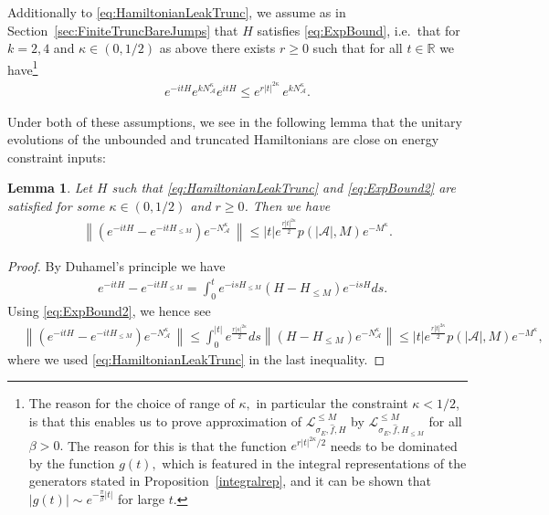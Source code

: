 \documentclass[11pt]{amsart}
\newcommand{\1}{\mathbbm{1}}
\newcommand{\R}{\mathbb{R}}
\newcommand{\N}{\mathbb{N}}
\newcommand{\NA}{N_{\mathcal{A}}}
\newcommand{\cA}{\mathcal{A}}
\newcommand{\bin}[1]{}
\theoremstyle{plain}
\newtheorem{lemma}[theorem]{Lemma}
\theoremstyle{definition}
\theoremstyle{remark}
\numberwithin{equation}{section}
\begin{document}
Additionally to \eqref{eq:HamiltonianLeakTrunc}, we assume as in Section~\ref{sec:FiniteTruncBareJumps} that $H$ satisfies \eqref{eq:ExpBound}, i.e.~that for $k=2,4$ and $\kappa\in(0,1/2)$ as above there exists $r\ge 0$ such that for all $t\in\R$ we have\footnote{The reason for the choice of range of $\kappa,$ in particular the constraint $\kappa<1/2$, is that this enables us to prove approximation of $\mathcal{L}^{\le M}_{\sigma_E,\widehat{f},H}$ by $\mathcal{L}^{\le M}_{\sigma_E,\widehat{f},H_{\le M}}$ for all $\beta>0.$ The reason for this is that the function $e^{r|t|^{2\kappa}/2}$ needs to be dominated by the function $g(t),$ which is featured in the integral representations of the generators stated in Proposition~\ref{integralrep}, and it can be shown that $|g(t)|
\sim
e^{-\tfrac{\pi}{\beta}|t|}$ for large $t.$ }
\begin{align}\label{eq:ExpBound2}
e^{-itH}e^{k\NA^\kappa} e^{itH}\le e^{r|t|^{2\kappa}}\,e^{k\NA^\kappa}.
\end{align}



\bin{\begin{align*}
    \left\|Q_Me^{-\NA^{\kappa}}\right\| \le \sup_{\substack{n_1,\cdots,n_m\in\N_0\\\exists n_i\ge M}} e^{-\sqrt{\sum_i n_i}} \le e^{-M^{\kappa}}.
\end{align*}}

Under both of these assumptions, we see in the following lemma that the unitary evolutions of the unbounded and truncated Hamiltonians are close on energy constraint inputs:
\begin{lemma}
\label{lem:HamEvolTrunc}
Let $H$ such that \eqref{eq:HamiltonianLeakTrunc} and \eqref{eq:ExpBound2} are satisfied for some $\kappa\in(0,1/2)$ and $r\ge 0$. Then we have
\begin{align*}
    \left\|\left(e^{-itH} - e^{-itH_{\le M}}\right)e^{-\NA^{\kappa}}\,\right\| \le |t|e^{\tfrac{r|t|^{2\kappa}}{2}}p(|\cA|,M)e^{-M^{\kappa}}.
\end{align*}

\end{lemma}
\begin{proof}
By Duhamel's principle we have
\begin{align*}
   &e^{-itH} - e^{-itH_{\le M}}= \int^t_0 e^{-isH_{\le M}}\left(H-H_{\le M}\right)e^{-isH} ds.
\end{align*}
Using \eqref{eq:ExpBound2}, we hence see
\begin{align*}
     &\left\|\left(e^{-itH} - e^{-itH_{\le M}}\right)e^{-\NA^{\kappa}}\,\right\| \le  \int_0^{|t|} e^{\tfrac{r|s|^{2\kappa}}{2}}ds\left\|(H-H_{\le M})e^{-\NA^{\kappa}}\right\|\le |t|e^{\tfrac{r|t|^{2\kappa}}{2}} p(|\cA|,M)e^{-M^{\kappa}},
\end{align*}
where we used \eqref{eq:HamiltonianLeakTrunc} in the last inequality.\end{proof}
\end{document}
